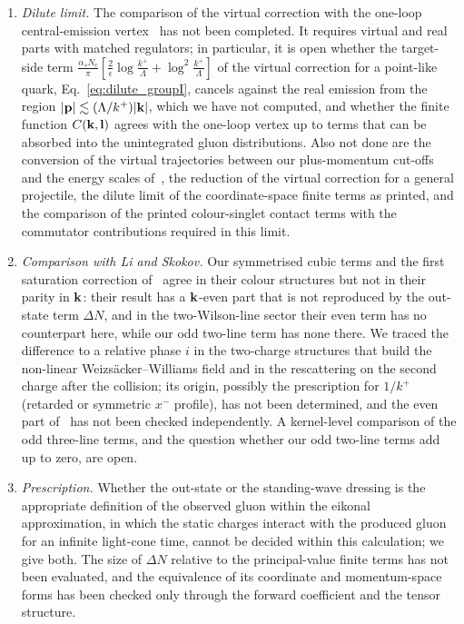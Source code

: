 \begin{enumerate}
\item[(i)] \emph{Dilute limit.} The comparison of the virtual correction with the one-loop central-emission vertex~\cite{Fadin:1998py,DelDuca:1998cx,Bartels:2006hg} has not been completed. It requires virtual and real parts with matched regulators; in particular, it is open whether the target-side term $\frac{\alpha_sN_c}{\pi}[\frac2\epsilon\log\frac{k^+}{\Lambda}+\log^2\frac{k^+}{\Lambda}]$ of the virtual correction for a point-like quark, Eq.~\eqref{eq:dilute_groupI}, cancels against the real emission from the region $|\mathbf{p}|\lesssim(\Lambda/k^+)|\mathbf{k}|$, which we have not computed, and whether the finite function $C(\mathbf{k},\mathbf{l})$ agrees with the one-loop vertex up to terms that can be absorbed into the unintegrated gluon distributions. Also not done are the conversion of the virtual trajectories between our plus-momentum cut-offs and the energy scales of~\cite{Bartels:2006hg}, the reduction of the virtual correction for a general projectile, the dilute limit of the coordinate-space finite terms as printed, and the comparison of the printed colour-singlet contact terms with the commutator contributions required in this limit.
\item[(ii)] \emph{Comparison with Li and Skokov.} Our symmetrised cubic terms and the first saturation correction of~\cite{Li:2021ntm} agree in their colour structures but not in their parity in $\mathbf{k}$: their result has a $\mathbf{k}$-even part that is not reproduced by the out-state term $\Delta N$, and in the two-Wilson-line sector their even term has no counterpart here, while our odd two-line term has none there. We traced the difference to a relative phase $i$ in the two-charge structures that build the non-linear Weizs\"acker--Williams field and in the rescattering on the second charge after the collision; its origin, possibly the prescription for $1/k^+$ (retarded or symmetric $x^-$ profile), has not been determined, and the even part of~\cite{Li:2021ntm} has not been checked independently. A kernel-level comparison of the odd three-line terms, and the question whether our odd two-line terms add up to zero, are open.
\item[(iii)] \emph{Prescription.} Whether the out-state or the standing-wave dressing is the appropriate definition of the observed gluon within the eikonal approximation, in which the static charges interact with the produced gluon for an infinite light-cone time, cannot be decided within this calculation; we give both. The size of $\Delta N$ relative to the principal-value finite terms has not been evaluated, and the equivalence of its coordinate and momentum-space forms has been checked only through the forward coefficient and the tensor structure.

\end{enumerate}
